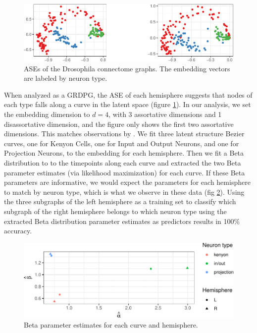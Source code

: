\documentclass[12pt]{article}
\begin{document}
\begin{figure}[H]

{\centering \includegraphics{draft_files/figure-latex/mbconnectome-ase-1} 

}

\caption{ASEs of the Drosophila connectome graphs. The embedding vectors are labeled by neuron type. }\label{fig:mbconnectome-ase}
\end{figure}

When analyzed as a GRDPG, the ASE of each hemisphere suggests that nodes
of each type falls along a curve in the latent space (figure
\ref{fig:mbconnectome-ase}). In our analysis, we set the embedding
dimension to \(d = 4\), with 3 assortative dimensions and 1
disassortative dimension, and the figure only shows the first two
assortative dimensions. This matches observations by
\citet{athreya2020estimation}. We fit three latent structure Bezier
curves, one for Kenyon Cells, one for Input and Output Neurons, and one
for Projection Neurons, to the embedding for each hemisphere. Then we
fit a Beta distribution to to the timepoints along each curve and
extracted the two Beta parameter estimates (via likelihood maximization)
for each curve. If these Beta parameters are informative, we would
expect the parameters for each hemisphere to match by neuron type, which
is what we observe in these data (fig \ref{fig:mbconnectome-beta}).
Using the three subgraphs of the left hemisphere as a training set to
classify which subgraph of the right hemisphere belongs to which neuron
type using the extracted Beta distribution parameter estimates as
predictors results in 100\% accuracy.

\begin{figure}[H]

{\centering \includegraphics{draft_files/figure-latex/mbconnectome-beta-1} 

}

\caption{Beta parameter estimates for each curve and hemisphere.}\label{fig:mbconnectome-beta}
\end{figure}
\end{document}
